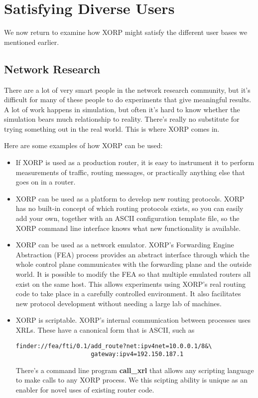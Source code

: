 \section{Satisfying Diverse Users}

We now return to examine how XORP might satisfy the different user
bases we mentioned earlier.

\subsection{Network Research}

There are a lot of very smart people in the network research
community, but it's difficult for many of these people to do experiments
that give meaningful results.  A lot of work happens in simulation,
but often it's hard to know whether the simulation bears much
relationship to reality.  There's really no substitute for trying
something out in the real world.  This is where XORP comes in.

Here are some examples of how XORP can be used:

\begin{itemize}
\item If XORP is used as a production router, it is easy to instrument
it to perform measurements of traffic, routing messages, or
practically anything else that goes on in a router.  

\item XORP can be used as a platform to develop new routing protocols.
XORP has no built-in concept of which routing protocols exists, so you
can easily add your own, together with an ASCII configuration template
file, so the XORP command line interface knows what new
functionality is available.

\item XORP can be used as a network emulator.
XORP's Forwarding Engine Abstraction (FEA) process provides an
abstract interface through which the whole control plane communicates
with the forwarding plane and the outside world.  It is possible to
modify the FEA so that multiple emulated routers all exist on the same
host.  This allows experiments using XORP's real routing code to take
place in a carefully controlled environment.  It also facilitates new
protocol development without needing a large lab of machines.

\item XORP is scriptable.  XORP's internal communication between
processes uses XRLs.
These have a canonical form that is ASCII, such as 
\vspace{-0.1in}
\begin{verbatim}
finder://fea/fti/0.1/add_route?net:ipv4net=10.0.0.1/8&\
                     gateway:ipv4=192.150.187.1
\end{verbatim}
\vspace{-0.1in} There's a command line program \textbf{call\_xrl} that
allows any scripting language to make calls to any XORP process.  We
this scipting ability is unique as an enabler for novel uses of
existing router code.
\end{itemize}

